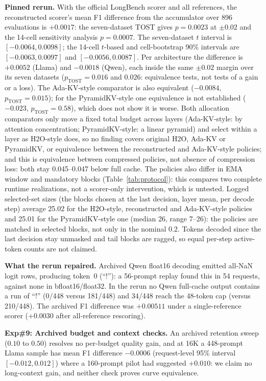 \textbf{Pinned rerun.} With the official LongBench scorer and all references, the
reconstructed scorer's mean F1 difference from the accumulator over 896 evaluations is
$+0.0017$: the seven-dataset TOST gives $p=0.0023$ at $\pm0.02$ and the 14-cell
sensitivity analysis $p=0.0007$. The seven-dataset $t$ interval is $[-0.0064,0.0098]$;
the 14-cell $t$-based and cell-bootstrap 90\% intervals are $[-0.0063,0.0097]$ and
$[-0.0056,0.0087]$. Per architecture the
difference is $+0.0052$ (Llama) and $-0.0018$ (Qwen), each inside the same $\pm0.02$
margin over its seven datasets ($p_{\mathrm{TOST}}=0.016$ and $0.026$: equivalence
tests, not tests of a gain or a loss). The Ada-KV-style comparator is also equivalent
($-0.0084$, $p_{\mathrm{TOST}}=0.015$); for the PyramidKV-style one equivalence is not
established ($-0.023$, $p_{\mathrm{TOST}}=0.58$), which does not show it is worse. Both allocation comparators only move a fixed total
budget across layers (Ada-KV-style: by attention concentration; PyramidKV-style: a
linear pyramid) and select within a layer as H2O-style does, so no finding covers original H2O, Ada-KV or
PyramidKV, or equivalence between the reconstructed and Ada-KV-style policies; and this
is equivalence between compressed policies, not absence of compression loss: both stay
0.045--0.047 below full cache. The policies also differ in EMA window and mandatory
blocks (Table~\ref{tab:protocol}): this compares two complete runtime realizations, not
a scorer-only intervention, which is untested. Logged selected-set sizes (the blocks
chosen at the last decision, layer mean, per decode step)
average 25.02 for the H2O-style, reconstructed and Ada-KV-style policies and 25.01 for
the PyramidKV-style one (median 26, range 7--26): the policies are matched in selected
blocks, not only in the nominal 0.2. Tokens decoded since the last decision stay
unmasked and tail blocks are ragged, so equal per-step active-token counts are not
claimed.

\textbf{What the rerun repaired.} Archived Qwen float16 decoding emitted all-NaN logit
rows, producing token~0 (``!''): a 56-prompt replay found this in 54 requests, against
none in bfloat16/float32. In the rerun no Qwen
full-cache output contains a run of ``!'' (0/448 versus 181/448) and 34/448 reach the
48-token cap (versus 210/448). The archived F1 difference was $+0.00511$ under a
single-reference scorer ($+0.0030$ after all-reference rescoring).

\textbf{Exp\#9: Archived budget and context checks.} An archived retention sweep
($0.10$ to $0.50$) resolves no per-budget quality gain, and at 16K a 448-prompt Llama
sample has mean F1 difference $-0.0006$ (request-level 95\% interval $[-0.012,0.012]$)
where a 160-prompt pilot had suggested $+0.010$: we claim no long-context gain, and
neither check proves curve equivalence.

